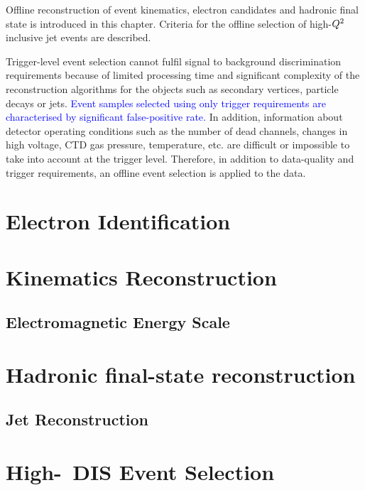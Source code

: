 Offline reconstruction of event kinematics, electron candidates and hadronic final state is introduced in this chapter. Criteria for the offline selection of high-$\mbox{${Q^2}$}$ inclusive jet events are described. 

Trigger-level event selection cannot fulfil signal to background discrimination requirements because of limited processing time and significant complexity of the reconstruction algorithms for the objects such as secondary vertices, particle decays or jets. \textcolor{blue}{Event samples selected using only trigger requirements are characterised by significant false-positive rate.} In addition, information about detector operating conditions such as the number of dead channels, changes in high voltage, CTD gas pressure, temperature, etc. are difficult or impossible to take into account at the trigger level. Therefore, in addition to data-quality and trigger requirements, an offline event selection is applied to the data.

\section{Electron Identification}
\label{sec:eleid}


\section{Kinematics Reconstruction}
\label{sec:kinrec}


\subsection{Electromagnetic Energy Scale}
\label{subsec:eleenescale}


\section{Hadronic final-state reconstruction}
\label{sec:hadronreco}


\subsection{Jet Reconstruction}
\label{sec:jetreco}


\section{High-\qsq\, DIS Event Selection}
\label{sec:dissel}

